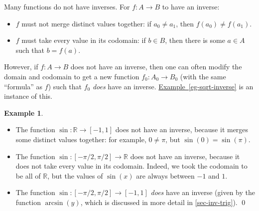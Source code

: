 \documentclass[a4paper]{book}
\newcommand{\RED}[1]{{\color{red}#1}}
\newcommand{\R}         {{\mathbb{R}}}
\newcommand{\xra}       {\xrightarrow}
\renewcommand{\:}{\colon}
\newcommand{\bilabel}[1]{\hypertarget{#1}{\label{#1}}}
\newcommand{\biref}[2]{\hyperlink{#2}{#1~\ref*{#2}}}
\newcommand{\EMPH}[1]{\RED{\emph{#1}}}
\theoremstyle{definition}
\newtheorem{example}[theorem]{Example}
\begin{document}
Many functions do not have inverses.  For $f\:A\xra{}B$ to have an
inverse: 
\begin{itemize}
 \item $f$ must not merge distinct values together:
  if $a_0\neq a_1$, then $f(a_0)\neq f(a_1)$.
 \item $f$ must take every value in its codomain:
  if $b\in B$, then there is some $a\in A$ such that $b=f(a)$.
\end{itemize}
However, if $f\:A\xra{}B$ does not have an inverse, then one can often
modify the domain and codomain to get a new function
$f_0\:A_0\xra{}B_0$ (with the same ``formula'' as $f$) such that $f_0$
\EMPH{does} have an inverse.  \biref{Example}{eg-sqrt-inverse} is an
instance of this.
\begin{example}\bilabel{eg-sin-inverse}
 \begin{itemize}
  \item The function $\sin\:\R\xra{}[-1,1]$ does not have an inverse,
   because it merges some distinct values together: for example,
   $0\neq\pi$, but $\sin(0)=\sin(\pi)$.
  \item The function $\sin\:[-\pi/2,\pi/2]\xra{}\R$ does not have an
   inverse, because it does not take every value in its codomain.
   Indeed, we took the codomain to be all of $\R$, but the values of
   $\sin(x)$ are always between $-1$ and $1$.
  \item The function $\sin\:[-\pi/2,\pi/2]\xra{}[-1,1]$ \EMPH{does}
   have an inverse (given by the function $\arcsin(y)$, which is
   discussed in more detail in \autoref{sec-inv-trig}). \qed
 \end{itemize}
\end{example}
\end{document}
